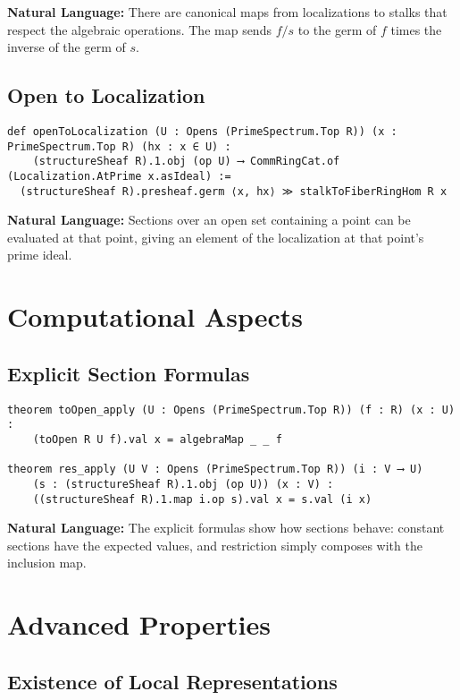 \documentclass{article}
\theoremstyle{definition}
\begin{document}
\textbf{Natural Language:} There are canonical maps from localizations to stalks that respect the algebraic operations. The map sends $f/s$ to the germ of $f$ times the inverse of the germ of $s$.

\subsection{Open to Localization}

\begin{lstlisting}
def openToLocalization (U : Opens (PrimeSpectrum.Top R)) (x : PrimeSpectrum.Top R) (hx : x ∈ U) :
    (structureSheaf R).1.obj (op U) ⟶ CommRingCat.of (Localization.AtPrime x.asIdeal) :=
  (structureSheaf R).presheaf.germ ⟨x, hx⟩ ≫ stalkToFiberRingHom R x
\end{lstlisting}

\textbf{Natural Language:} Sections over an open set containing a point can be evaluated at that point, giving an element of the localization at that point's prime ideal.

\section{Computational Aspects}

\subsection{Explicit Section Formulas}

\begin{lstlisting}
theorem toOpen_apply (U : Opens (PrimeSpectrum.Top R)) (f : R) (x : U) :
    (toOpen R U f).val x = algebraMap _ _ f

theorem res_apply (U V : Opens (PrimeSpectrum.Top R)) (i : V ⟶ U)
    (s : (structureSheaf R).1.obj (op U)) (x : V) :
    ((structureSheaf R).1.map i.op s).val x = s.val (i x)
\end{lstlisting}

\textbf{Natural Language:} The explicit formulas show how sections behave: constant sections have the expected values, and restriction simply composes with the inclusion map.

\section{Advanced Properties}

\subsection{Existence of Local Representations}
\end{document}
